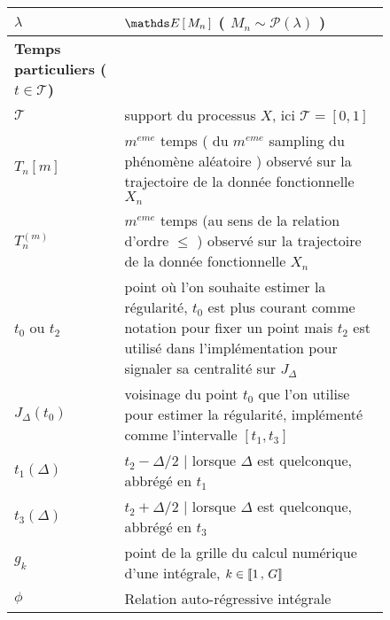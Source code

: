 \begin{figure}[H]
\begin{tabularx}{\textwidth}{lX}
	\midrule
	$\lambda$       & $\esperance{M_n}$ ( $M_n \sim \mathcal P(\lambda)$ )                                                                                                                                            \\
	\midrule
	\textbf{Temps particuliers ($t \in \mathcal T$)}                                                                                                                                                                  \\
	\midrule
	$\mathcal T$    & support du processus $X$, ici $\mathcal T = [0,1]$                                                                                                                                              \\
	$T_n[m]$        & $m^{eme}$ temps ( du $m^{eme}$ sampling du phénomène aléatoire ) observé sur la trajectoire de la donnée fonctionnelle $X_n$                                                                    \\
	$T_n^{(m)}$     & $m^{eme}$ temps (au sens de la relation d'ordre $\leq$ ) observé sur la trajectoire de la donnée fonctionnelle $X_n$                                                                            \\
	$t_0$ ou $t_2$  & point où l'on souhaite estimer la régularité, $t_0$ est plus courant comme notation pour fixer un point mais $t_2$ est utilisé dans l'implémentation pour signaler sa centralité sur $J_\Delta$ \\
	$J_\Delta(t_0)$ & \og voisinage \fg du point $t_0$ que l'on utilise pour estimer la régularité, implémenté comme l'intervalle $[t_1, t_3]$                                                                        \\
	$t_1(\Delta)$   & $t_2 - \Delta/2$ | lorsque $\Delta$ est quelconque, abbrégé en $t_1$                                                                                                                            \\
	$t_3(\Delta)$   & $t_2 + \Delta/2$ | lorsque $\Delta$ est quelconque, abbrégé en $t_3$                                                                                                                            \\
	$g_k$           & point de la grille du calcul numérique d'une intégrale, $k \in \llbracket 1 \, , \, G \rrbracket$                                                                                                               \\
	\midrule
	$\phi$          & Relation auto-régressive intégrale                                                                                                                                                              \\

\end{tabularx}
\end{figure}
